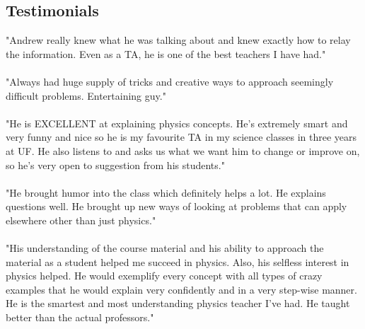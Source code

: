\begin{resume}
    \section{\mysidestyle Testimonials}
              "Andrew really knew what he was talking about and knew exactly how to relay the information. Even as a TA, he is one of the best teachers I have had."
             \\ \\ "Always had huge supply of tricks and creative ways to approach seemingly difficult problems. Entertaining guy."
             \\ \\ "He is EXCELLENT at explaining physics concepts. He's extremely smart and very funny and nice so he is my favourite TA in my science classes in three years at UF. He also listens to and asks us what we want him to change or improve on, so he's very open to suggestion from his students."
             \\ \\ "He brought humor into the class which definitely helps a lot. He explains questions well. He brought up new ways of looking at problems that can apply elsewhere other than just physics."
             \\ \\ "His understanding of the course material and his ability to approach the material as a student helped me succeed in physics. Also, his selfless interest in physics helped. He would exemplify every concept with all types of crazy examples that he would explain very confidently and in a very step-wise manner. He is the smartest and most understanding physics teacher I've had. He taught better than the actual professors."
\end{resume}


